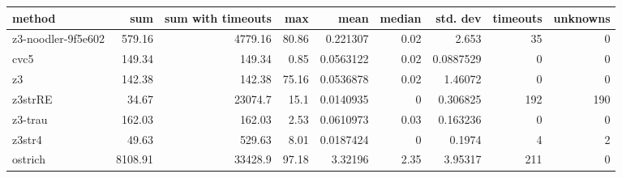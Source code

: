 \begin{tabular}{lrrrrrrrr}
\hline
 method             &     sum &   sum with timeouts &   max &      mean &   median &   std. dev &   timeouts &   unknowns \\
\hline
 z3-noodler-9f5e602 &  579.16 &             4779.16 & 80.86 & 0.221307  &     0.02 &  2.653     &         35 &          0 \\
 cvc5               &  149.34 &              149.34 &  0.85 & 0.0563122 &     0.02 &  0.0887529 &          0 &          0 \\
 z3                 &  142.38 &              142.38 & 75.16 & 0.0536878 &     0.02 &  1.46072   &          0 &          0 \\
 z3strRE            &   34.67 &            23074.7  & 15.1  & 0.0140935 &     0    &  0.306825  &        192 &        190 \\
 z3-trau            &  162.03 &              162.03 &  2.53 & 0.0610973 &     0.03 &  0.163236  &          0 &          0 \\
 z3str4             &   49.63 &              529.63 &  8.01 & 0.0187424 &     0    &  0.1974    &          4 &          2 \\
 ostrich            & 8108.91 &            33428.9  & 97.18 & 3.32196   &     2.35 &  3.95317   &        211 &          0 \\
\hline
\end{tabular}

